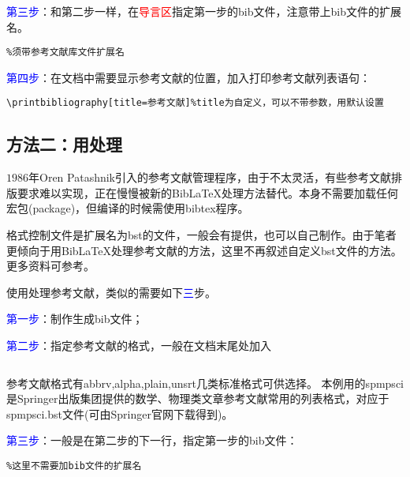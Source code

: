 \documentclass[cn,hazy,blue,14pt,geye,normal,]{elegantnote}
\begin{document}
\textcolor{blue}{第三步}：和第二步一样，在\textcolor{red}{导言区}指定第一步的bib文件，注意带上bib文件的扩展名。
\begin{example}
	\label{example:02}
\begin{lstlisting}
%须带参考文献库文件扩展名
\end{lstlisting}\par
\end{example}
\textcolor{blue}{第四步}：在文档中需要显示参考文献的位置，加入打印参考文献列表语句：
\begin{example}
\begin{lstlisting}
\printbibliography[title=参考文献]%title为自定义，可以不带参数，用默认设置
\end{lstlisting}
\end{example}
\subsection{方法二：用\BibTeX{}处理}
\(1986\)年Oren Patashnik引入的参考文献管理程序\BibTeX{}，由于不太灵活，有些参考文献排版要求难以实现，正在慢慢被新的Bib\LaTeX{}处理方法替代。\BibTeX{}本身不需要加载任何宏包(package)，但编译的时候需使用bibtex程序。\par
\BibTeX{}格式控制文件是扩展名为bst的文件，一般会有提供，也可以自己制作。由于笔者更倾向于用Bib\LaTeX{}处理参考文献的方法，这里不再叙述自定义bst文件的方法。更多\BibTeX{}资料可参考\cite{胡伟2013LATEX,chikilyyongfeng2019,mittelbach2004latex}。\par
使用\BibTeX{}处理参考文献，类似的需要如下\textcolor{blue}{三}步。\par
\textcolor{blue}{第一步}：制作生成bib文件；\par
\textcolor{blue}{第二步}：指定参考文献的格式，一般在文档末尾处加入
\begin{example}
\begin{lstlisting}

\end{lstlisting}\par
\end{example}
参考文献格式有abbrv,alpha,plain,unsrt几类标准格式可供选择。
本例用的spmpsci是Springer出版集团提供的数学、物理类文章参考文献常用的列表格式，对应于spmpsci.bst文件(可由Springer官网下载得到)。\par
\textcolor{blue}{第三步}：一般是在第二步的下一行，指定第一步的bib文件：
\begin{example}
\label{example:03}
\begin{lstlisting}
%这里不需要加bib文件的扩展名
\end{lstlisting}
\end{example}
\end{document}
